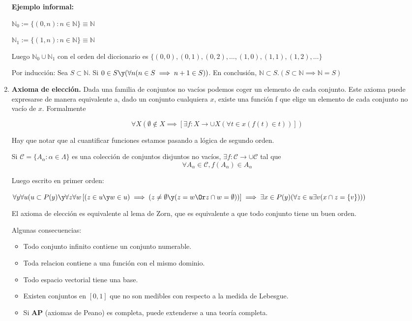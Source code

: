 \begin{enumerate}
		 \textbf{Ejemplo informal:}
		 
		 $\mathbb{N}_0:=\{(0, n): n\in \mathbb{N}\}\equiv \mathbb{N}$
		 
		 $\mathbb{N}_1:=\{(1, n): n\in \mathbb{N}\}\equiv \mathbb{N}$
		 
		 Luego $\mathbb{N}_0\cup\mathbb{N}_1$ con el orden del diccionario es $\{(0,0), (0,1), (0,2), \hdots, (1,0),(1,1), (1,2), \hdots\}$
		 
		 Por inducción: Sea $S\subset\mathbb{N}$. Si $0\in S\y(\forall n(n\in S\implies n+1\in S))$. En conclusión, $\mathbb{N}\subset S. (S\subset \mathbb{N}\implies \mathbb{N}=S)$
		 
		 \item \textbf{Axioma de elección.} Dada una familia de conjuntos no vacíos podemos coger un elemento de cada conjunto. Este axioma puede expresarse de manera equivalente a, dado un conjunto cualquiera $x$, existe una función f que elige un elemento de cada conjunto no vacío de $x$. Formalmente
		 
		 $$\forall X(\emptyset\notin X \implies \left[ \exists f:X\to\cup X (\forall t\in x(f(t)\in t))\right])$$
		 		 
		 Hay que notar que al cuantificar funciones estamos pasando a lógica de segundo orden.
		 
		 Si $\mathcal{C}=\{A_\alpha: \alpha\in \Lambda\}$ es una colección de conjuntos disjuntos no vacíos, $\exists f:\mathcal{C}\to \cup\mathcal{C}$ tal que $$\forall A_\alpha \in \mathcal{C}, f(A_\alpha)\in A_\alpha$$
		 
		 Luego escrito en primer orden:
		 
		 $\forall y\forall u (u\subset P(y) \y \forall z\forall w\left[(z\in u \y w\in u)\implies (z\neq \emptyset\y (z = w \Or z\cap w = \emptyset ))\right]\implies \exists x \in P(y) (\forall z \in u \exists v (x\cap z = \{v\})))$
		 		 
		 El axioma de elección es equivalente al lema de Zorn, que es equivalente a que todo conjunto tiene un buen orden.
		 
		 Algunas consecuencias:
		 \begin{itemize}
		 	\item Todo conjunto infinito contiene un conjunto numerable.
		 	\item Toda relacion contiene a una función con el mismo dominio.
		 	\item Todo espacio vectorial tiene una base.
		 	\item Existen conjuntos en $[0,1]$ que no son medibles con respecto a la medida de Lebesgue.
		 	\item Si \textbf{AP} (axiomas de Peano) es completa, puede extenderse a una teoría completa.
		 \end{itemize}
	\end{enumerate}
	
